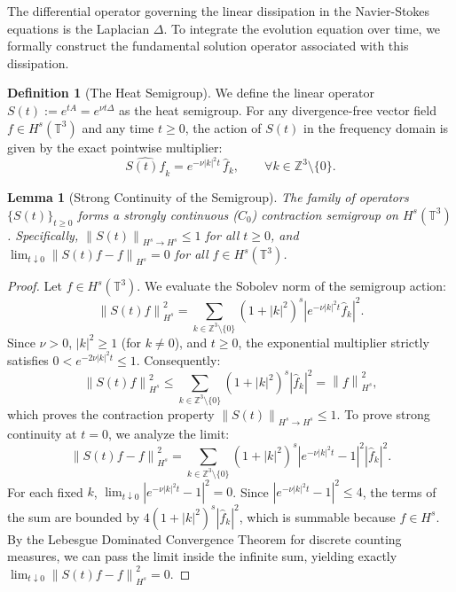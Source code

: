 \documentclass[12pt,a4paper]{article}
\theoremstyle{plain}
\newtheorem{lemma}[theorem]{Lemma}
\theoremstyle{definition}
\newtheorem{definition}[theorem]{Definition}
\theoremstyle{remark}
\newcommand{\Hs}{H^s}
\newcommand{\T}{\mathbb{T}}
\newcommand{\Z}{\mathbb{Z}}
\newcommand{\norm}[1]{\left\|#1\right\|}
\newcommand{\abs}[1]{\left|#1\right|}
\begin{document}
The differential operator governing the linear dissipation in the Navier-Stokes equations is the Laplacian $\Delta$. To integrate the evolution equation over time, we formally construct the fundamental solution operator associated with this dissipation.

\begin{definition}[The Heat Semigroup]
\label{def:semigroupe}
We define the linear operator $S(t) := e^{tA} = e^{\nu t\Delta}$ as the heat semigroup. For any divergence-free vector field $f \in \Hs(\T^3)$ and any time $t \ge 0$, the action of $S(t)$ in the frequency domain is given by the exact pointwise multiplier:
\[
  \widehat{S(t)f}_k = e^{-\nu|k|^2 t}\,\hat{f}_k, \qquad \forall k\in\Z^3\setminus\{0\}.
\]
\end{definition}

\begin{lemma}[Strong Continuity of the Semigroup]
\label{lem:strong_continuity}
The family of operators $\{S(t)\}_{t \ge 0}$ forms a strongly continuous ($C_0$) contraction semigroup on $\Hs(\T^3)$. Specifically, $\norm{S(t)}_{H^s \to H^s} \le 1$ for all $t \ge 0$, and $\lim_{t \downarrow 0} \norm{S(t)f - f}_{H^s} = 0$ for all $f \in \Hs(\T^3)$.
\end{lemma}

\begin{proof}
Let $f \in \Hs(\T^3)$. We evaluate the Sobolev norm of the semigroup action:
\[
  \norm{S(t)f}_{H^s}^2 = \sum_{k\in\Z^3\setminus\{0\}} (1+|k|^2)^s \abs{e^{-\nu|k|^2 t}\hat{f}_k}^2.
\]
Since $\nu > 0$, $|k|^2 \ge 1$ (for $k \neq 0$), and $t \ge 0$, the exponential multiplier strictly satisfies $0 < e^{-2\nu|k|^2 t} \le 1$. Consequently:
\[
  \norm{S(t)f}_{H^s}^2 \le \sum_{k\in\Z^3\setminus\{0\}} (1+|k|^2)^s \abs{\hat{f}_k}^2 = \norm{f}_{H^s}^2,
\]
which proves the contraction property $\norm{S(t)}_{H^s \to H^s} \le 1$. 
To prove strong continuity at $t=0$, we analyze the limit:
\[
  \norm{S(t)f - f}_{H^s}^2 = \sum_{k\in\Z^3\setminus\{0\}} (1+|k|^2)^s \abs{e^{-\nu|k|^2 t} - 1}^2 \abs{\hat{f}_k}^2.
\]
For each fixed $k$, $\lim_{t \downarrow 0} \abs{e^{-\nu|k|^2 t} - 1}^2 = 0$. Since $\abs{e^{-\nu|k|^2 t} - 1}^2 \le 4$, the terms of the sum are bounded by $4(1+|k|^2)^s \abs{\hat{f}_k}^2$, which is summable because $f \in H^s$. By the Lebesgue Dominated Convergence Theorem for discrete counting measures, we can pass the limit inside the infinite sum, yielding exactly $\lim_{t \downarrow 0} \norm{S(t)f - f}_{H^s}^2 = 0$.
\end{proof}
\end{document}
